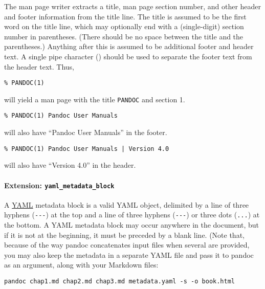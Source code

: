 \documentclass[]{article}
\begin{document}
The man page writer extracts a title, man page section number, and other
header and footer information from the title line. The title is assumed
to be the first word on the title line, which may optionally end with a
(single-digit) section number in parentheses. (There should be no space
between the title and the parentheses.) Anything after this is assumed
to be additional footer and header text. A single pipe character
(\texttt{\textbar{}}) should be used to separate the footer text from
the header text. Thus,

\begin{verbatim}
% PANDOC(1)
\end{verbatim}

will yield a man page with the title \texttt{PANDOC} and section 1.

\begin{verbatim}
% PANDOC(1) Pandoc User Manuals
\end{verbatim}

will also have ``Pandoc User Manuals'' in the footer.

\begin{verbatim}
% PANDOC(1) Pandoc User Manuals | Version 4.0
\end{verbatim}

will also have ``Version 4.0'' in the header.

\hypertarget{extension-yaml_metadata_block}{%
\paragraph{\texorpdfstring{Extension:
\texttt{yaml\_metadata\_block}}{Extension: yaml\_metadata\_block}}\label{extension-yaml_metadata_block}}

A \href{https://yaml.org/spec/1.2/spec.html}{YAML} metadata block is a
valid YAML object, delimited by a line of three hyphens
(\texttt{-\/-\/-}) at the top and a line of three hyphens
(\texttt{-\/-\/-}) or three dots (\texttt{...}) at the bottom. A YAML
metadata block may occur anywhere in the document, but if it is not at
the beginning, it must be preceded by a blank line. (Note that, because
of the way pandoc concatenates input files when several are provided,
you may also keep the metadata in a separate YAML file and pass it to
pandoc as an argument, along with your Markdown files:

\begin{verbatim}
pandoc chap1.md chap2.md chap3.md metadata.yaml -s -o book.html
\end{verbatim}
\end{document}
